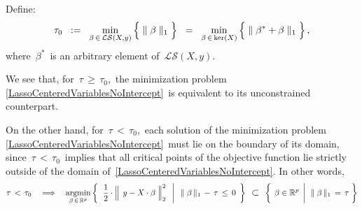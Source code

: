 \begin{itemize}
	\vskip 0.2cm
	Define:
	\begin{equation*}
	\tau_{0}
	\;\; := \;\;
		\underset{\beta\,\in\,\mathcal{LS}(X,y)}{\min}
		\left\{\;
			\Vert\; \overset{{\color{white}.}}{\beta} \;\Vert_{1}
			\;\right\}
	\;\; = \;\;
		\underset{\beta\,\in\,\ker(X)}{\min}
		\left\{\;
			\Vert\; \beta^{*} + \overset{{\color{white}.}}{\beta} \;\Vert_{1}
			\;\right\},
	\end{equation*}
	where \,$\beta^{*}$\, is an arbitrary element of \,$\mathcal{LS}(X,y)$.
	
	\vskip 0.2cm
	We see that, for \,$\tau \,\geq\, \tau_{0}$,\, the minimization problem
	\,\eqref{LassoCenteredVariablesNoIntercept}\,
	is equivalent to its unconstrained counterpart.

	\vskip 0.2cm
	On the other hand, for \,$\tau \,<\, \tau_{0}$,\, each solution of the minimization problem
	\,\eqref{LassoCenteredVariablesNoIntercept}\,
	must lie on the boundary of its domain,
	since \,$\tau \,<\, \tau_{0}$\, implies that
	all critical points of the objective function lie strictly outside
	of the domain of \,\eqref{LassoCenteredVariablesNoIntercept}.
	In other words,
	{\color{red}\begin{equation*}
	\tau \,<\, \tau_{0}
	\quad\Longrightarrow\quad
		\underset{\beta\,\in\,\Re^{p}}{\argmin}
		\left\{\;\,
			\left.
			\dfrac{1}{2}
			\cdot
			\left\Vert\;\, y \overset{{\color{white}.}}{-} X\cdot\beta \;\right\Vert_{2}^{2}
			\;\;\,\right\vert\;\;
			\Vert\;\beta\,\Vert_{1} \, - \, \tau \, \leq \, 0
			\,\;\right\}
		\;\;\textnormal{\large$\subset$}\;\;
		\left\{\;
			\left.
			\overset{{\color{white}1}}{\beta} \in \Re^{p}
			\;\,\right\vert\;\,
			\Vert\;\beta\,\Vert_{1} \, = \, \tau
			\;\right\}
	\end{equation*}}
\end{itemize}


